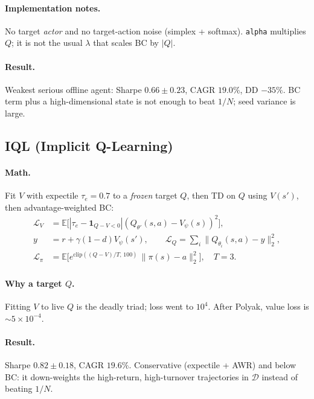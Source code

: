 \documentclass[11pt]{article}
\begin{document}
\paragraph{Implementation notes.}
No target \emph{actor} and no target-action noise (simplex + softmax).
\texttt{alpha} multiplies $Q$; it is not the usual $\lambda$ that scales BC
by $|Q|$.

\paragraph{Result.}
Weakest serious offline agent: Sharpe $0.66\pm 0.23$, CAGR $19.0\%$,
DD $-35\%$.
BC term plus a high-dimensional state is not enough to beat $1/N$;
seed variance is large.

\subsection{IQL (Implicit Q-Learning)}

\paragraph{Math.}
Fit $V$ with expectile $\tau_e=0.7$ to a \emph{frozen} target $Q$, then TD
on $Q$ using $V(s')$, then advantage-weighted BC:
\begin{align}
\mathcal{L}_V &= \mathbb{E}\bigl[|\tau_e-\mathbf{1}_{Q-V<0}|
(Q_{\theta'}(s,a)-V_\psi(s))^2\bigr], \\
y &= r+\gamma(1-d)V_\psi(s'),\qquad
\mathcal{L}_Q=\sum_i\|Q_{\theta_i}(s,a)-y\|_2^2, \\
\mathcal{L}_\pi &= \mathbb{E}\bigl[e^{\mathrm{clip}((Q-V)/T,\,100)}\,
\|\pi(s)-a\|_2^2\bigr],\quad T=3.
\end{align}

\paragraph{Why a target $Q$.}
Fitting $V$ to live $Q$ is the deadly triad; loss went to $10^4$.
After Polyak, value loss is $\sim 5\times 10^{-4}$.

\paragraph{Result.}
Sharpe $0.82\pm 0.18$, CAGR $19.6\%$.
Conservative (expectile + AWR) and below BC: it down-weights the high-return,
high-turnover trajectories in $\mathcal{D}$ instead of beating $1/N$.
\end{document}
